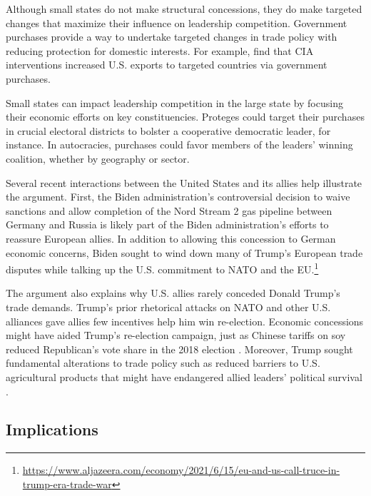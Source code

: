 \documentclass[12pt]{article}
\begin{document}
Although small states do not make structural concessions, they do make targeted changes that maximize their influence on leadership competition.
Government purchases provide a way to undertake targeted changes in trade policy with reducing protection for domestic interests. 
For example, \citep{Bergeretal2013} find that CIA interventions increased U.S. exports to targeted countries via government purchases.


Small states can impact leadership competition in the large state by focusing their economic efforts on key constituencies.
Proteges could target their purchases in crucial electoral districts to bolster a cooperative democratic leader, for instance. 
In autocracies, purchases could favor members of the leaders' winning coalition, whether by geography or sector.


Several recent interactions between the United States and its allies help illustrate the argument. 
First, the Biden administration's controversial decision to waive sanctions and allow completion of the Nord Stream 2 gas pipeline between Germany and Russia is likely part of the Biden administration's efforts to reassure European allies. 
In addition to allowing this concession to German economic concerns, Biden sought to wind down many of Trump's European trade disputes while talking up the U.S. commitment to NATO and the EU.\footnote{\url{https://www.aljazeera.com/economy/2021/6/15/eu-and-us-call-truce-in-trump-era-trade-war}}


The argument also explains why U.S. allies rarely conceded Donald Trump's trade demands. 
Trump's prior rhetorical attacks on NATO and other U.S. alliances gave allies few incentives help him win re-election. 
Economic concessions might have aided Trump's re-election campaign, just as Chinese tariffs on soy reduced Republican's vote share in the 2018 election \citep{ChyzhUrbatsch2021}. 
Moreover, Trump sought fundamental alterations to trade policy such as reduced barriers to U.S. agricultural products that might have endangered allied leaders' political survival \citep{HeeParkJensen2007}.



\subsection{Implications}
\end{document}
